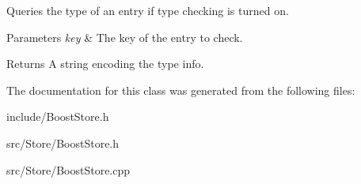 Queries the type of an entry if type checking is turned on. 


\begin{DoxyParams}{Parameters}
{\em key} & The key of the entry to check. \\
\hline
\end{DoxyParams}
\begin{DoxyReturn}{Returns}
A string encoding the type info. 
\end{DoxyReturn}


The documentation for this class was generated from the following files\-:\begin{DoxyCompactItemize}
\item 
include/Boost\-Store.\-h\item 
src/\-Store/Boost\-Store.\-h\item 
src/\-Store/Boost\-Store.\-cpp\end{DoxyCompactItemize}

